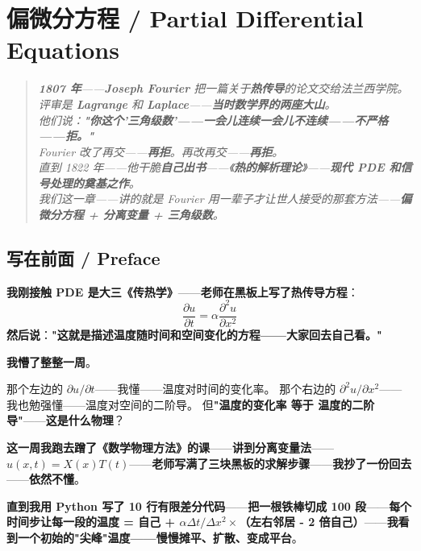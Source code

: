 
\chapter{偏微分方程 / Partial Differential Equations}
\label{ch:pde}

\begin{quote}\itshape
\textbf{1807 年}——\textbf{Joseph Fourier} 把一篇关于\textbf{热传导}的论文交给法兰西学院。\\
评审是 \textbf{Lagrange} 和 \textbf{Laplace}——\textbf{当时数学界的两座大山}。\\
他们说：\textbf{"你这个'三角级数'——一会儿连续一会儿不连续——不严格——拒。"}\\
Fourier 改了再交——\textbf{再拒}。再改再交——\textbf{再拒}。\\
直到 1822 年——他干脆\textbf{自己出书}——《\textbf{热的解析理论}》——\textbf{现代 PDE 和信号处理的奠基之作}。\\[4pt]
我们这一章——讲的就是 Fourier 用一辈子才让世人接受的那套方法——\textbf{偏微分方程 + 分离变量 + 三角级数}。
\end{quote}

\section{写在前面 / Preface}

\textbf{我刚接触 PDE 是大三《传热学》}——\textbf{老师在黑板上写了热传导方程}：
\[
\frac{\partial u}{\partial t} = \alpha \frac{\partial^2 u}{\partial x^2}
\]
\textbf{然后说}：\textbf{"这就是描述温度随时间和空间变化的方程——大家回去自己看。"}

\textbf{我懵了整整一周}。

那个左边的 $\partial u / \partial t$——我懂——温度对时间的变化率。
那个右边的 $\partial^2 u / \partial x^2$——我也勉强懂——温度对空间的二阶导。
但\textbf{"温度的变化率 等于 温度的二阶导"}——\textbf{这是什么物理}？

\textbf{这一周我跑去蹭了《数学物理方法》的课}——\textbf{讲到分离变量法}——\textbf{$u(x,t) = X(x) T(t)$}——\textbf{老师写满了三块黑板的求解步骤}——\textbf{我抄了一份回去}——\textbf{依然不懂}。

\textbf{直到我用 Python 写了 10 行有限差分代码}——\textbf{把一根铁棒切成 100 段}——\textbf{每个时间步让每一段的温度 = 自己 + $\alpha\Delta t / \Delta x^2 \times$（左右邻居 - 2 倍自己）}——\textbf{我看到一个初始的"尖峰"温度——慢慢摊平、扩散、变成平台}。

